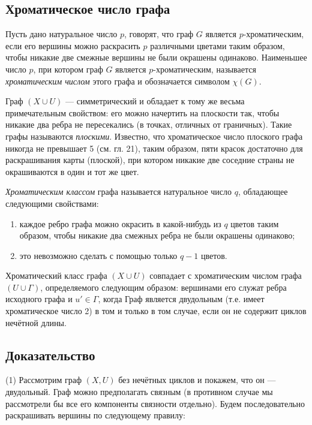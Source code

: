 \subsection{Хроматическое число графа}

Пусть дано натуральное число \( p \), говорят, что граф \( G \) является \( p \)-хроматическим, если его вершины можно раскрасить \( p \) различными цветами таким образом, чтобы никакие две смежные вершины не были окрашены одинаково. Наименьшее число \( p \), при котором граф \( G \) является \( p \)-хроматическим, называется \textit{хроматическим числом} этого графа и обозначается символом \(\chi(G)\).

Граф \( (X \cup U) \) — симметрический и обладает к тому же весьма примечательным свойством: его можно начертить на плоскости так, чтобы никакие два ребра не пересекались (в точках, отличных от граничных). Такие графы называются \textit{плоскими}. Известно, что хроматическое число плоского графа никогда не превышает 5 (см. гл. 21), таким образом, пяти красок достаточно для раскрашивания карты (плоской), при котором никакие две соседние страны не окрашиваются в один и тот же цвет.

\textit{Хроматическим классом} графа называется натуральное число \( q \), обладающее следующими свойствами:

\begin{enumerate}
    \item каждое ребро графа можно окрасить в какой-нибудь из \( q \) цветов таким образом, чтобы никакие два смежных ребра не были окрашены одинаково;
    \item это невозможно сделать с помощью только \( q - 1 \) цветов.
\end{enumerate}

Хроматический класс графа \( (X \cup U) \) совпадает с хроматическим числом графа \( (U \cup \Gamma) \), определяемого следующим образом: вершинами его служат ребра исходного графа и \( u' \in \Gamma \), когда Граф является двудольным (т.е. имеет хроматическое число 2) в том и только в том случае, если он не содержит циклов нечётной длины.

\subsection*{Доказательство}

(1) Рассмотрим граф \( (X, U) \) без нечётных циклов и покажем, что он — двудольный. Граф можно предполагать связным (в противном случае мы рассмотрели бы все его компоненты связности отдельно). Будем последовательно раскрашивать вершины по следующему правилу:


